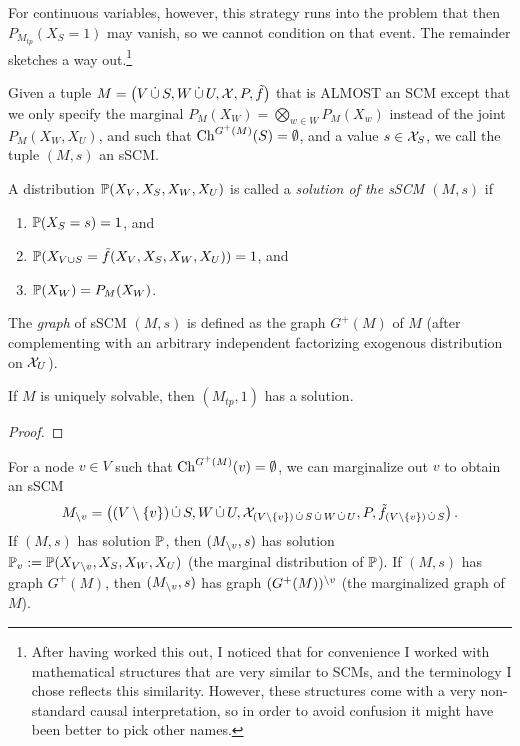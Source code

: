For continuous variables, however, this strategy runs into the problem that then $P_{M_{tp}}(X_S=1)$ may vanish, so we cannot condition on that event.
The remainder sketches a way out.\footnote{After having worked this out, I noticed that for convenience I worked with mathematical structures that are
very similar to SCMs, and the terminology I chose reflects this similarity. However, these structures come with a very non-standard causal interpretation,
so in order to avoid confusion it might have been better to pick other names.}

\begin{Def}\label{def:sscm}
  Given a tuple $M = \left ( V \,\dot{\cup}\, S,W \,\dot{\cup}\, U,\mathcal{X},P,\tilde f \right )$ that is ALMOST an SCM except that we only specify the marginal $P_M(X_W) = \bigotimes_{w \in W} P_M(X_w)$ instead of the joint $P_M(X_W,X_U)$,
  and such that $\mathrm{Ch}^{G^+(M)}(S) = \emptyset$, and a value $s \in \mathcal{X}_S$, we call the tuple $(M,s)$ an sSCM.

  A distribution $\mathbb{P}(X_V,X_S,X_W,X_U)$ is called a \emph{solution of the sSCM $(M,s)$} if
  \begin{enumerate}
    \item $\mathbb{P}(X_S=s)=1$, and
    \item $\mathbb{P}(X_{V \cup S} = \tilde f(X_V,X_S,X_W,X_U))=1$, and
    \item $\mathbb{P}(X_W) = P_M(X_W)$.
  \end{enumerate}

  The \emph{graph} of sSCM $(M,s)$ is defined as the graph $G^+(M)$ of $M$ (after complementing with an arbitrary independent factorizing exogenous distribution on $\mathcal{X}_U$).
\end{Def}

\begin{Prp}
  If $M$ is uniquely solvable, then $(M_{tp},1)$ has a solution.
\end{Prp}
\begin{proof}
\end{proof}

\begin{Rem}
  For a node $v \in V$ such that $\mathrm{Ch}^{G^+(M)}(v) = \emptyset$, we can marginalize out $v$ to obtain an sSCM
  $$M_{\setminus v} = \left ( (V \setminus \{v\}) \,\dot{\cup}\, S, W \,\dot{\cup}\, U, \mathcal{X}_{(V \setminus \{v\}) \,\dot{\cup}\, S \,\dot{\cup}\, W \,\dot{\cup}\, U}, P, \tilde f_{(V \setminus \{v\}) \,\dot{\cup}\, S} \right ).$$
  If $(M,s)$ has solution $\mathbb{P}$, then $(M_{\setminus v},s)$ has solution $\mathbb{P}_v := \mathbb{P}(X_{V\setminus v},X_S,X_W,X_U)$ (the marginal distribution of $\mathbb{P}$).
  If $(M,s)$ has graph $G^+(M)$, then $(M_{\setminus v},s)$ has graph $(G^+(M))^{\setminus v}$ (the marginalized graph of $M$).
\end{Rem}

